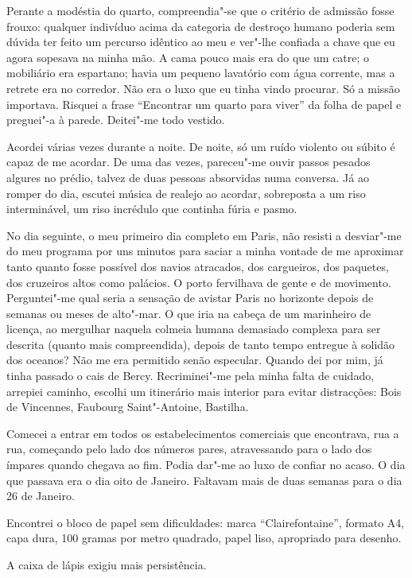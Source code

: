 Perante a modéstia do quarto, compreendia"-se que o critério de admissão
fosse frouxo: qualquer indivíduo acima da categoria de destroço humano
poderia sem dúvida ter feito um percurso idêntico ao meu e ver"-lhe
confiada a chave que eu agora sopesava na minha mão. A cama pouco mais
era do
que um catre; o mobiliário era espartano; havia um pequeno lavatório com
água corrente, mas a retrete era no corredor. Não era o luxo que eu
tinha vindo procurar. Só a missão importava. Risquei a frase
``Encontrar um quarto para viver'' da folha de papel e preguei"-a à
parede. Deitei"-me todo vestido.

Acordei várias vezes durante a noite. De noite, só um ruído violento ou
súbito é capaz de me acordar. De uma das vezes, pareceu"-me ouvir passos
pesados algures no prédio, talvez de duas pessoas absorvidas numa
conversa. Já ao romper do dia, escutei música de realejo ao acordar,
sobreposta a um riso interminável, um riso incrédulo que continha
fúria e pasmo.

No dia seguinte, o meu primeiro dia completo em Paris, não resisti a
desviar"-me do meu programa por uns minutos para saciar a minha vontade
de me aproximar tanto quanto fosse possível dos navios atracados, dos
cargueiros, dos paquetes, dos cruzeiros altos como palácios. O porto
fervilhava de gente e de movimento. Perguntei"-me qual seria a sensação
de avistar Paris no horizonte depois de semanas ou meses de alto"-mar. O
que iria na cabeça de um marinheiro de licença, ao mergulhar naquela
colmeia humana demasiado complexa para ser descrita (quanto mais
compreendida), depois de tanto tempo entregue à solidão dos oceanos? Não
me era permitido senão especular. Quando dei por mim, já tinha passado
o cais de Bercy. Recriminei"-me pela minha falta de cuidado, arrepiei
caminho, escolhi um itinerário mais interior para evitar distracções:
Bois de Vincennes, Faubourg Saint"-Antoine, Bastilha.

Comecei a entrar em todos os estabelecimentos comerciais que encontrava,
rua a rua, começando pelo lado dos números pares, atravessando para o
lado dos ímpares quando chegava ao fim. Podia dar"-me ao luxo de confiar
no acaso. O dia que
passava era o dia oito de Janeiro. Faltavam mais de duas semanas para
o dia 26 de Janeiro.

Encontrei o bloco de papel sem dificuldades: marca ``Clairefontaine'',
formato A4, capa dura, 100 gramas por metro quadrado, papel liso,
apropriado para desenho.

A caixa de lápis exigiu mais persistência.


